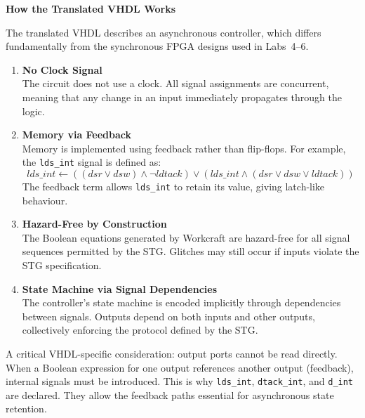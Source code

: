 \documentclass[a4paper,12pt]{article}
\begin{document}
\textbf{How the Translated VHDL Works}

The translated VHDL describes an asynchronous controller, which differs fundamentally from the synchronous FPGA designs used in Labs~4--6.

\begin{enumerate}
    \item \textbf{No Clock Signal} \\
    The circuit does not use a clock. All signal assignments are concurrent, meaning that any change in an input immediately propagates through the logic.

    \item \textbf{Memory via Feedback} \\
    Memory is implemented using feedback rather than flip-flops. For example, the \texttt{lds\_int} signal is defined as:
    \begin{equation}
        lds\_int \leftarrow ((dsr \lor dsw) \land \lnot ldtack) \lor
        (lds\_int \land (dsr \lor dsw \lor ldtack))
    \end{equation}
    The feedback term allows \texttt{lds\_int} to retain its value, giving latch-like behaviour.

    \item \textbf{Hazard-Free by Construction} \\
    The Boolean equations generated by Workcraft are hazard-free for all signal sequences permitted by the STG. Glitches may still occur if inputs violate the STG specification.

    \item \textbf{State Machine via Signal Dependencies} \\
    The controller’s state machine is encoded implicitly through dependencies between signals. Outputs depend on both inputs and other outputs, collectively enforcing the protocol defined by the STG.
\end{enumerate}

A critical VHDL-specific consideration: output ports cannot be read directly. When a Boolean expression for one output references another output (feedback), internal signals must be introduced. This is why \texttt{lds\_int}, \texttt{dtack\_int}, and \texttt{d\_int} are declared. They allow the feedback paths essential for asynchronous state retention.
\end{document}
